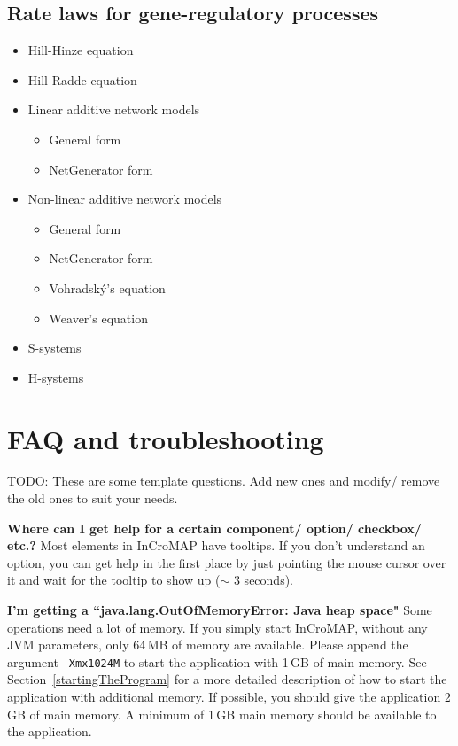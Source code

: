 \section{Rate laws for gene-regulatory processes}
\begin{itemize}
  \item Hill-Hinze equation \citep{Hinze2007}
  \item Hill-Radde equation \citep{Radde2007a, Radde2007}
  \item Linear additive network models
    \begin{itemize}
      \item General form
      \item NetGenerator form \citep{Toepfer2007}
    \end{itemize}
  \item Non-linear additive network models
    \begin{itemize}
      \item General form
      \item NetGenerator form \citep{Toepfer2007}
      \item Vohradsk{\'y}'s equation \citep{Vu2007}
      \item Weaver's equation \citep{Weaver1999}
    \end{itemize}
  \item S-systems \citep{Savageau1969, spieth04optimizing, Tournier2005, Spieth2006, Hecker2009}
  \item H-systems \citep{Spieth2006}
\end{itemize}


\chapter{FAQ and troubleshooting}
\label{ch:faq}

TODO: These are some template questions. Add new ones and modify/ remove the
old ones to suit your needs.

\noindent \textbf{Where can I get help for a certain component/ option/ checkbox/ etc.?}\newline
Most elements in InCroMAP have tooltips. If you don't understand an option, you
can get help in the first place by just pointing the mouse cursor over it and
wait for the tooltip to show up ($\sim$ 3 seconds).\newline

\noindent \textbf{I'm getting a ``java.lang.OutOfMemoryError: Java heap space"}\newline
Some operations need a lot of memory. If you simply start InCroMAP, without any
JVM parameters, only 64\,MB of memory are available. Please append the argument
\texttt{-Xmx1024M} to start the application with 1\,GB of main memory. See
Section~\vref{startingTheProgram} for a more detailed description of how to
start the application with additional memory. If possible, you should give the
application 2\,GB of main memory. A minimum of 1\,GB main memory should be
available to the application.\newline

